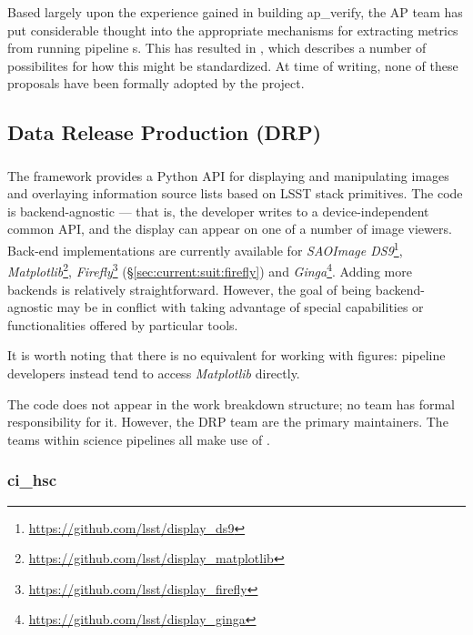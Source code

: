 \documentclass[DM,authoryear,toc,lsstdraft]{lsstdoc}
\begin{document}
Based largely upon the experience gained in building ap\_verify, the AP team
has put considerable thought into the appropriate mechanisms for extracting
\glspl{metric} from running pipeline s. This has resulted in
, which describes a number of possibilites for how this might
be standardized. At time of writing, none of these proposals have been
formally adopted by the project.

\subsection{Data Release Production (DRP)}
\label{sec:current:drp}

\subsubsection{}
\label{sec:current:drp:afwDisplay}

The  framework provides a Python API for displaying and
manipulating images and overlaying information source lists based on LSST
stack primitives. The code is backend-agnostic --- that is, the developer
writes to a device-independent common API, and the display can appear on one
of a number of image viewers. Back-end implementations are currently available
for \textit{SAOImage DS9}\footnote{\url{https://github.com/lsst/display_ds9}},
\textit{Matplotlib}\footnote{\url{https://github.com/lsst/display_matplotlib}},
\textit{Firefly}\footnote{\url{https://github.com/lsst/display_firefly}}
(\S\ref{sec:current:suit:firefly}) and
\textit{Ginga}\footnote{\url{https://github.com/lsst/display_ginga}}. Adding
more backends is relatively straightforward. However, the goal of being
backend-agnostic may be in conflict with taking advantage of special
capabilities or functionalities offered by particular tools.

It is worth noting that there is no  equivalent for working
with figures: pipeline developers instead tend to access \textit{Matplotlib}
directly.

The  code does not appear in the work breakdown structure; no
team has formal responsibility for it. However, the DRP team are the primary
maintainers. The teams within science pipelines all make use of .

\subsubsection{ci\_hsc}
\label{sec:current:drp:cihsc}
\end{document}
